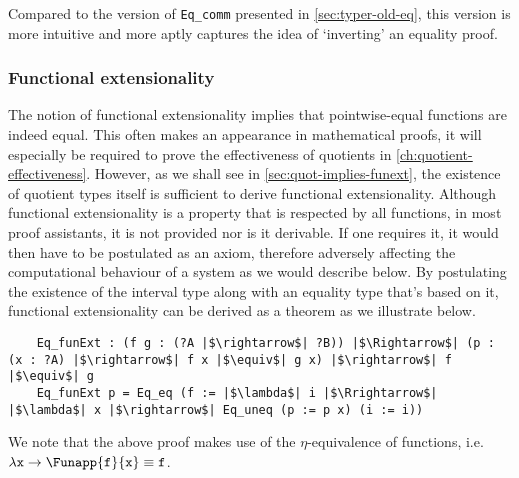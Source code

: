 \documentclass[12pt,twoside,maitrise]{dms}
\theoremstyle{definition}
\numberwithin{equation}{section}
\numberwithin{table}{chapter}
\numberwithin{figure}{chapter}
\newcommand\id[1] {\texttt{#1}}
\begin{document}
Compared to the version of \id{Eq\_comm} presented in
\autoref{sec:typer-old-eq}, this version is more intuitive and more aptly
captures the idea of `inverting' an equality proof.

\subsubsection*{Functional extensionality}\label{subsec:funext}
The notion of functional extensionality implies that pointwise-equal functions
are indeed equal. This often makes an appearance in mathematical proofs, it will
especially be required to prove the effectiveness of quotients in
\autoref{ch:quotient-effectiveness}. However, as we shall see in
\autoref{sec:quot-implies-funext}, the existence of quotient types itself is
sufficient to derive functional extensionality. Although functional
extensionality is a property that is respected by all functions, in most proof
assistants, it is not provided nor is it derivable. If one requires it, it would
then have to be postulated as an axiom, therefore adversely affecting the
computational behaviour of a system as we would describe below. By postulating
the existence of the interval type along with an equality type that's
based on it, functional extensionality can be derived as a theorem as we
illustrate below.

\begin{verbatim}
    Eq_funExt : (f g : (?A |$\rightarrow$| ?B)) |$\Rightarrow$| (p : (x : ?A) |$\rightarrow$| f x |$\equiv$| g x) |$\rightarrow$| f |$\equiv$| g
    Eq_funExt p = Eq_eq (f := |$\lambda$| i |$\Rrightarrow$| |$\lambda$| x |$\rightarrow$| Eq_uneq (p := p x) (i := i))
\end{verbatim}

We note that the above proof makes use of the $\eta$-equivalence of functions,
i.e. $\lambda \id{x} \rightarrow \Funapp{\id{f}}{\id{x}} \equiv \id{f}$.


\end{document}
